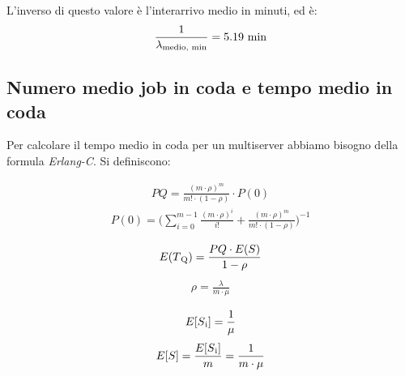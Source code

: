\documentclass[a4paper, 12pt]{article}
\begin{document}
L'inverso di questo valore è l'interarrivo medio in minuti, ed è:
\[
  \frac{1}{\lambda\textsubscript{medio, min}} = 5.19\text{ min}
\]

\subsection{Numero medio job in coda e tempo medio in coda}
Per calcolare il tempo medio in coda per un multiserver abbiamo bisogno della
formula \emph{Erlang-C}. Si definiscono:

\[
\begin{aligned}
  PQ = \frac{(m \cdot \rho)^m}{m! \cdot (1 - \rho)} \cdot P(0) 
\end{aligned}
\]
\[
\begin{aligned}
  P(0) = \bigg(\sum_{i=0}^{m - 1} \frac{(m \cdot \rho)^i}{i!} + \frac{(m \cdot \rho)^m}{m!
\cdot (1- \rho)}\bigg)^{-1}
\end{aligned}
\]

\[
\begin{aligned}
  E(T\textsubscript{Q}) = \frac{PQ \cdot E(S)}{1 - \rho} \\
\end{aligned}
\]
\[
\begin{aligned}
  \rho = \frac{\lambda}{m \cdot \mu}
\end{aligned}
\]

\[
\begin{aligned}
  E[S\textsubscript{i}] = \frac{1}{\mu}
\end{aligned}
\]
\[
\begin{aligned}
  E[S] = \frac{E[S\textsubscript{i}]}{m} = \frac{1}{m \cdot \mu}
\end{aligned}
\]
\end{document}

